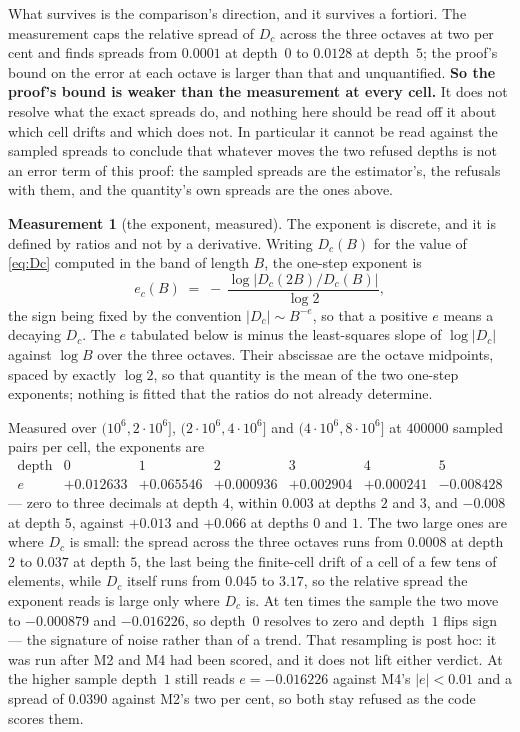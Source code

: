 \documentclass[11pt,a4paper]{article}
\theoremstyle{plain}
\theoremstyle{definition}
\newtheorem{measurement}[theorem]{Measurement}
\theoremstyle{remark}
\begin{document}
What survives is the comparison's direction, and it survives a
fortiori. The measurement caps the relative spread of $D_c$ across the
three octaves at two per cent and finds spreads from $0.0001$ at
depth~$0$ to $0.0128$ at depth~$5$; the proof's bound on the error at
each octave is larger than that and unquantified. \textbf{So the
proof's bound is weaker than the measurement at every cell.} It does
not resolve what the exact spreads do, and nothing here should be read
off it about which cell drifts and which does not. In particular it
cannot be read against the sampled spreads to conclude that whatever
moves the two refused depths is not an error term of this proof: the
sampled spreads are the estimator's, the refusals with them, and the
quantity's own spreads are the ones above.

\begin{measurement}[the exponent, measured]\label{meas:scaleinv}
The exponent is discrete, and it is defined by ratios and not by a
derivative. Writing $D_c(B)$ for the value of \eqref{eq:Dc} computed in
the band of length $B$, the one-step exponent is
\[
  e_c(B)\;=\;-\,\frac{\log\bigl|D_c(2B)/D_c(B)\bigr|}{\log 2},
\]
the sign being fixed by the convention $|D_c|\sim B^{-e}$, so that a
positive $e$ means a decaying $D_c$. The $e$ tabulated below is minus
the least-squares slope of $\log|D_c|$ against $\log B$ over the three
octaves. Their abscissae are the octave midpoints, spaced by exactly
$\log 2$, so that quantity is the mean of the two one-step exponents;
nothing is fitted that the ratios do not already determine.

Measured over $(10^6,2\cdot10^6]$, $(2\cdot10^6,4\cdot10^6]$ and
$(4\cdot10^6,8\cdot10^6]$ at $400000$ sampled pairs per cell, the
exponents are
\[
\begin{array}{r|cccccc}
 \text{depth} & 0 & 1 & 2 & 3 & 4 & 5\\\hline
 e & +0.012633 & +0.065546 & +0.000936 & +0.002904 & +0.000241
   & -0.008428
\end{array}
\]
--- zero to three decimals at depth $4$, within $0.003$ at depths $2$
and $3$, and $-0.008$ at depth $5$, against $+0.013$ and $+0.066$ at
depths $0$ and $1$. The two large ones are where $D_c$ is small: the
spread across the three octaves runs from $0.0008$ at depth $2$ to
$0.037$ at depth $5$, the last being the finite-cell drift of a
cell of a few tens of elements, while $D_c$
itself runs from $0.045$ to $3.17$, so the relative spread the exponent
reads is large only where $D_c$ is. At ten times the sample the two
move to $-0.000879$ and $-0.016226$, so depth~$0$ resolves to zero and
depth~$1$ flips sign --- the signature of noise rather than of a trend.
That resampling is post hoc: it was run after M2 and M4 had been
scored, and it does not lift either verdict. At the higher sample
depth~$1$ still reads $e=-0.016226$ against M4's $|e|<0.01$ and a
spread of $0.0390$ against M2's two per cent, so both stay refused
as the code scores them.


\end{measurement}
\end{document}
